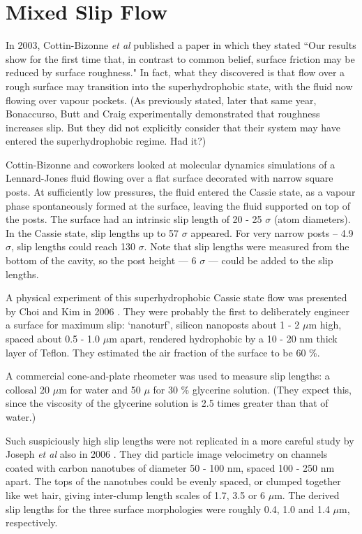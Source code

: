 \documentclass[a4paper]{report}
\begin{document}
\section{Mixed Slip Flow}

In 2003, Cottin-Bizonne \emph{et al} published a paper \cite{Cottin-Bizonne2003} in which they stated ``Our results show for the first time that, in contrast to common belief, surface friction may be reduced by surface roughness."  In fact, what they discovered is that flow over a rough surface may transition into the superhydrophobic state, with the fluid now flowing over vapour pockets.  (As previously stated, later that same year, Bonaccurso, Butt and Craig \cite{BonaccursoButtCraig2003} experimentally demonstrated that roughness increases slip. But they did not explicitly consider that their system may have entered the superhydrophobic regime.  Had it?)

Cottin-Bizonne and coworkers looked at molecular dynamics simulations of a Lennard-Jones fluid flowing over a flat surface decorated with narrow square posts.  At sufficiently low pressures, the fluid entered the Cassie state, as a vapour phase spontaneously formed at the surface, leaving the fluid supported on top of the posts.  The surface had an intrinsic slip length of 20 - 25 $\sigma$ (atom diameters).  In the Cassie state, slip lengths up to 57 $\sigma$ appeared.  For very narrow posts -- 4.9 $\sigma$, slip lengths could reach 130 $\sigma$.  Note that slip lengths were measured from the bottom of the cavity, so the post height --- 6 $\sigma$ --- could be added to the slip lengths.


A physical experiment of this superhydrophobic Cassie state flow was presented by Choi and Kim in 2006 \cite{ChoiKim2006}.  They were probably the first to deliberately engineer a surface for maximum slip: `nanoturf', silicon nanoposts about 1 - 2 $\mu$m high, spaced about 0.5 - 1.0 $\mu$m apart, rendered hydrophobic by a 10 - 20 nm thick layer of Teflon.  They estimated the air fraction of the surface to be 60 \%.

A commercial cone-and-plate rheometer was used to measure slip lengths: a collosal 20 $\mu$m for water and 50 $\mu$ for 30 \% glycerine solution.  (They expect this, since the viscosity of the glycerine solution is 2.5 times greater than that of water.)

Such suspiciously high slip lengths were not replicated in a more careful study by Joseph \emph{et al} also in 2006 \cite{Joseph2006}.  They did particle image velocimetry on channels coated with carbon nanotubes of diameter 50 - 100 nm, spaced 100 - 250 nm apart.  The tops of the nanotubes could be evenly spaced, or clumped together like wet hair, giving inter-clump length scales of 1.7, 3.5 or 6 $\mu$m.  The derived slip lengths for the three surface morphologies were roughly 0.4, 1.0 and 1.4 $\mu$m, respectively.
\end{document}
